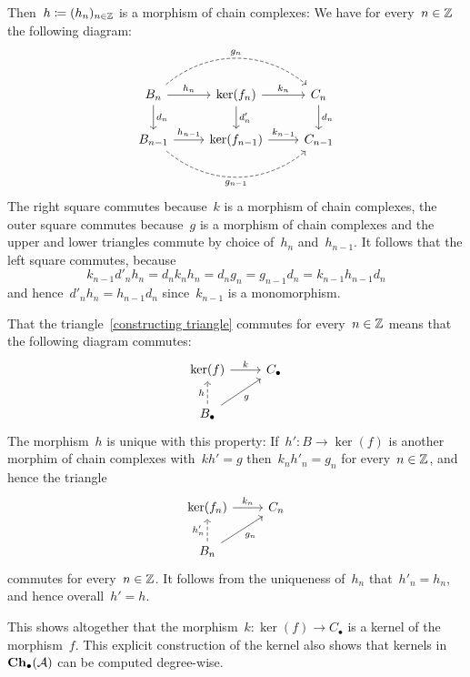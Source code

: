 Then~$h \coloneqq (h_n)_{n \in \mathbb{Z}}$ is a morphism of chain complexes: We have for every~$n \in \mathbb{Z}$ the following diagram:
\begin{equation}
  \label{cheese block}
  \begin{tikzcd}
      B_n
      \arrow[dashed, bend left = 40]{rr}[above]{g_n}
      \arrow{r}[above]{h_n}
      \arrow{d}[right]{d_n}
    & \ker(f_n)
      \arrow{r}[above]{k_n}
      \arrow{d}[right]{d'_n}
    & C_n
      \arrow{d}[right]{d_n}
    \\
      B_{n-1}
      \arrow{r}[above]{h_{n-1}}
      \arrow[dashed, bend right = 40]{rr}[below]{g_{n-1}}
    & \ker(f_{n-1})
      \arrow{r}[above]{k_{n-1}}
    & C_{n-1}
  \end{tikzcd}
\end{equation}
The right square commutes because~$k$ is a morphism of chain complexes, the outer square commutes because~$g$ is a morphism of chain complexes and the upper and lower triangles commute by choice of~$h_n$ and~$h_{n-1}$.
It follows that the left square commutes, because
\[
    k_{n-1} d'_n h_n
  = d_n k_n h_n
  = d_n g_n
  = g_{n-1} d_n
  = k_{n-1} h_{n-1} d_n
\]
and hence~$d'_n h_n = h_{n-1} d_n$ since~$k_{n-1}$ is a monomorphism.

That the triangle~\eqref{constructing triangle} commutes for every~$n \in \mathbb{Z}$ means that the following diagram commutes:
\[
  \begin{tikzcd}
      \ker(f)
      \arrow{r}[above]{k}
    & C_\bullet
    \\
      B_\bullet
      \arrow[dashed]{u}[left]{h}
      \arrow{ur}[below right]{g}
    & {}
  \end{tikzcd}
\]
The morphism~$h$ is unique with this property:
If~$h' \colon B \to \ker(f)$ is another morphim of chain complexes with~$k h' = g$ then~$k_n h'_n = g_n$ for every~$n \in \mathbb{Z}$, and hence the triangle
\[
  \begin{tikzcd}
      \ker(f_n)
      \arrow{r}[above]{k_n}
    & C_n
    \\
      B_n
      \arrow[dashed]{u}[left]{h'_n}
      \arrow{ur}[below right]{g_n}
    & {}
  \end{tikzcd}
\]
commutes for every~$n \in \mathbb{Z}$.
It follows from the uniqueness of~$h_n$ that~$h'_n = h_n$, and hence overall~$h' = h$.

This shows altogether that the morphism~$k \colon \ker(f) \to C_\bullet$ is a kernel of the morphism~$f$.
This explicit construction of the kernel also shows that kernels in~$\mathbf{Ch}_\bullet(\mathcal{A})$ can be computed degree-wise.

